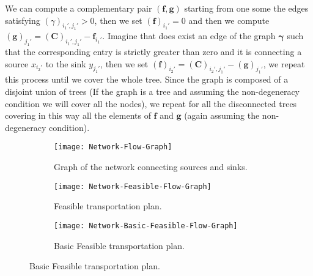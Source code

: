 We can compute a complementary pair $(\mathbf{f}, \mathbf{g})$ starting from one some the edges satisfying $(\gamma)_{i_1',j_1'}>0$, then we set $(\mathbf{f})_{i_1'}=0$ and then we compute $(\mathbf{g})_{j_1'}=(\mathbf{C})_{i_1',j_1'}-\mathbf{f}_{i_1'}$. Imagine that does exist an edge of the graph $\pmb{\gamma}$ such that the corresponding entry is strictly greater than zero and it is connecting a source $x_{i_2'}$ to the sink $y_{j_1'}$, then we set $(\mathbf{f})_{i_2'}=(\mathbf{C})_{i_2',j_1'}-(\mathbf{g})_{j_1'}$, we repeat this process until we cover the whole tree. Since the graph is composed of a disjoint union of trees (If the graph is a tree and assuming the non-degeneracy condition we will cover all the nodes), we repeat for all the disconnected trees covering in this way all the elements of $\mathbf{f}$ and $\mathbf{g}$ (again assuming the non-degeneracy condition).
 
\begin{figure}[H]
 \begin{center}
	\begin{subfigure}{0.3\textwidth}
		\centering
	 	\caption{Graph of the network connecting sources and sinks.}
	 	\texttt{[image: Network-Flow-Graph]}
	\end{subfigure}
	\begin{subfigure}{0.3\textwidth}
		\centering
		\caption{Feasible transportation plan.}
		\texttt{[image: Network-Feasible-Flow-Graph]}
	\end{subfigure}
	\begin{subfigure}{0.3\textwidth}
		\centering
		\caption{Basic Feasible transportation plan.}
		\texttt{[image: Network-Basic-Feasible-Flow-Graph]}
	\end{subfigure}
 \end{center}
\end{figure}

